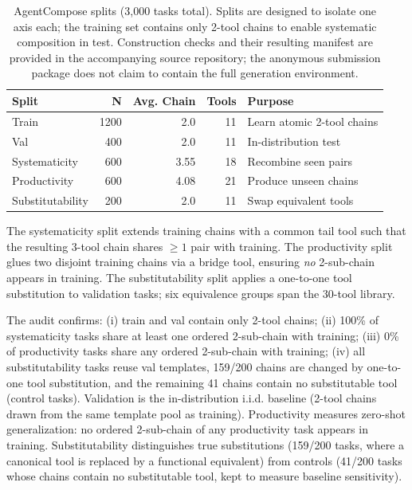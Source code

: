 ﻿\documentclass{article}
\begin{document}
\begin{table}[t]
    \centering
    \small
    \begin{tabular}{lrrrl}
        \toprule
        Split & N & Avg. Chain & Tools & Purpose \\
        \midrule
        Train & 1200 & 2.0 & 11 & Learn atomic 2-tool chains \\
        Val & 400 & 2.0 & 11 & In-distribution test \\
        Systematicity & 600 & 3.55 & 18 & Recombine seen pairs \\
        Productivity & 600 & 4.08 & 21 & Produce unseen chains \\
        Substitutability & 200 & 2.0 & 11 & Swap equivalent tools \\
        \bottomrule
    \end{tabular}
    \caption{AgentCompose splits (3{,}000 tasks total). Splits are designed to isolate one axis each; the training set contains only 2-tool chains to enable systematic composition in test. Construction checks and their resulting manifest are provided in the accompanying source repository; the anonymous submission package does not claim to contain the full generation environment.}
    \label{tab:splits}
\end{table}

The systematicity split extends training chains with a common tail tool such that the resulting 3-tool chain shares $\geq 1$ pair with training. The productivity split glues two disjoint training chains via a bridge tool, ensuring \emph{no} 2-sub-chain appears in training. The substitutability split applies a one-to-one tool substitution to validation tasks; six equivalence groups span the 30-tool library.

The audit confirms: (i) train and val contain only 2-tool chains; (ii) 100\% of systematicity tasks share at least one ordered 2-sub-chain with training; (iii) 0\% of productivity tasks share any ordered 2-sub-chain with training; (iv) all substitutability tasks reuse val templates, 159/200 chains are changed by one-to-one tool substitution, and the remaining 41 chains contain no substitutable tool (control tasks). Validation is the in-distribution i.i.d. baseline (2-tool chains drawn from the same template pool as training). Productivity measures zero-shot generalization: no ordered 2-sub-chain of any productivity task appears in training. Substitutability distinguishes true substitutions (159/200 tasks, where a canonical tool is replaced by a functional equivalent) from controls (41/200 tasks whose chains contain no substitutable tool, kept to measure baseline sensitivity).
\end{document}
